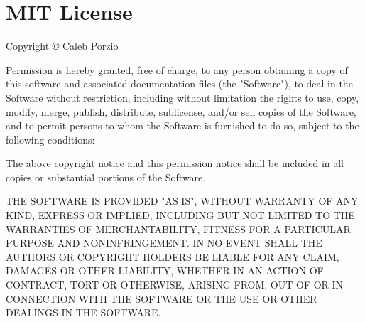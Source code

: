 \chapter{MIT License }
\hypertarget{md__c_1_2xampp_2htdocs_2_g_pagos_ayuntamiento_2vendor_2livewire_2livewire_2_l_i_c_e_n_s_e}{}\label{md__c_1_2xampp_2htdocs_2_g_pagos_ayuntamiento_2vendor_2livewire_2livewire_2_l_i_c_e_n_s_e}
\label{md__c_1_2xampp_2htdocs_2_g_pagos_ayuntamiento_2vendor_2livewire_2livewire_2_l_i_c_e_n_s_e_autotoc_md9795}%
%


Copyright © Caleb Porzio

Permission is hereby granted, free of charge, to any person obtaining a copy of this software and associated documentation files (the "{}\+Software"{}), to deal in the Software without restriction, including without limitation the rights to use, copy, modify, merge, publish, distribute, sublicense, and/or sell copies of the Software, and to permit persons to whom the Software is furnished to do so, subject to the following conditions\+:

The above copyright notice and this permission notice shall be included in all copies or substantial portions of the Software.

THE SOFTWARE IS PROVIDED "{}\+AS IS"{}, WITHOUT WARRANTY OF ANY KIND, EXPRESS OR IMPLIED, INCLUDING BUT NOT LIMITED TO THE WARRANTIES OF MERCHANTABILITY, FITNESS FOR A PARTICULAR PURPOSE AND NONINFRINGEMENT. IN NO EVENT SHALL THE AUTHORS OR COPYRIGHT HOLDERS BE LIABLE FOR ANY CLAIM, DAMAGES OR OTHER LIABILITY, WHETHER IN AN ACTION OF CONTRACT, TORT OR OTHERWISE, ARISING FROM, OUT OF OR IN CONNECTION WITH THE SOFTWARE OR THE USE OR OTHER DEALINGS IN THE SOFTWARE. 